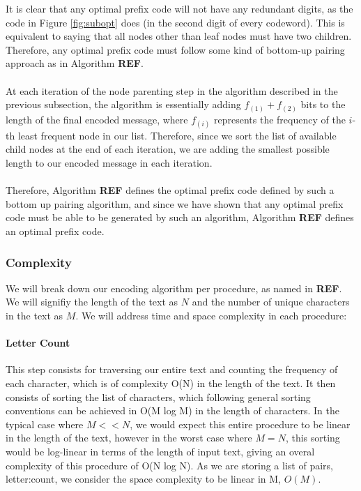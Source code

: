 \documentclass[paper=a4, fontsize=10pt]{article} %
\numberwithin{equation}{section} %
\numberwithin{figure}{section} %
\numberwithin{table}{section} %
\begin{document}
It is clear that any optimal prefix code will not have any redundant digits, as the code in Figure \ref{fig:subopt} does (in the second digit of every codeword). This is equivalent to saying that all nodes other than leaf nodes must have two children. Therefore, any optimal prefix code must follow some kind of bottom-up pairing approach as in Algorithm \textbf{REF}.
\\
\\
At each iteration of the node parenting step in the algorithm described in the previous subsection, the algorithm is essentially adding $f_{(1)} + f_{(2)}$ bits to the length of the final encoded message, where $f_{(i)}$ represents the frequency of the $i$-th least frequent node in our list. Therefore, since we sort the list of available child nodes at the end of each iteration, we are adding the smallest possible length to our encoded message in each iteration.
\\
\\
Therefore, Algorithm \textbf{REF} defines the optimal prefix code defined by such a bottom up pairing algorithm, and since we have shown that any optimal prefix code must be able to be generated by such an algorithm, Algorithm \textbf{REF} defines an optimal prefix code.

\subsubsection{Complexity}

We will break down our encoding algorithm per procedure, as named in \textbf{REF}. We will signifiy the length of the text as $N$ and the number of unique characters in the text as $M$. We will address time and space complexity in each procedure:

\paragraph{Letter Count}
This step consists for traversing our entire text and counting the frequency of each character, which is of complexity O(N) in the length of the text. It then consists of sorting the list of characters, which following general sorting conventions can be achieved in O(M log M) in the length of characters. In the typical case where $M << N$, we would expect this entire procedure to be linear in the length of the text, however in the worst case where $M = N$, this sorting would be log-linear in terms of the length of input text, giving an overal complexity of this procedure of O(N log N). As we are storing a list of pairs, letter:count, we consider the space complexity to be linear in M, $O(M)$.
\end{document}

